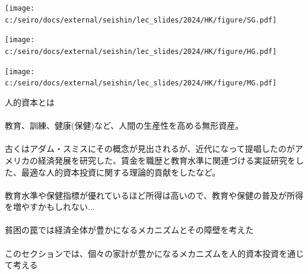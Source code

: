 \frame{\titlepage}
\setcounter{page}{1}

\def\Perp{\mkern2mu\rotatebox[origin=c]{90}{$\models$}\mkern2mu}



\begin{frame}{}
\hfil\texttt{[image: c:/seiro/docs/external/seishin/lec\_slides/2024/HK/figure/SG.pdf]}
\end{frame}
\begin{frame}{}
\hfil\texttt{[image: c:/seiro/docs/external/seishin/lec\_slides/2024/HK/figure/HG.pdf]}
\end{frame}
\begin{frame}{}
\hfil\texttt{[image: c:/seiro/docs/external/seishin/lec\_slides/2024/HK/figure/MG.pdf]}
\end{frame}
\begin{frame}[label=WhatIsHumanCapital]{}
人的資本とは\\~\\
\pause
教育、訓練、健康(保健)など、人間の生産性を高める無形資産。\\~\\
\pause
古くはアダム・スミスにその概念が見出されるが、近代になって提唱したのがアメリカの経済発展を研究した\citet{Schultz1960, Schultz1961}、賃金を職歴と教育水準に関連づける実証研究をした\citet{Mincer1974}、最適な人的資本投資に関する理論的貢献をした\citet{Becker1962, Becker1964}など。\\~\\
\pause
教育水準や保健指標が優れているほど所得は高いので、教育や保健の普及が所得を増やすかもしれない...\\~\\
\pause
貧困の罠では経済全体が豊かになるメカニズムとその障壁を考えた\\~\\
このセクションでは、個々の家計が豊かになるメカニズムを人的資本投資を通じて考える
\end{frame}









